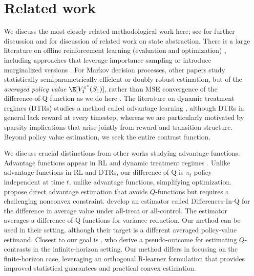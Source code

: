 \documentclass[opre,nonblindrev]{informs4}
\begin{document}
\section{Related work}
We discuss the most closely related methodological work here; see  for further discussion and  for discussion of related work on state abstraction. There is a large literature on offline reinforcement learning (evaluation and optimization) \citep{jin2021pessimism,xie2021bellman}, including approaches that leverage importance sampling or introduce marginalized versions \citep{jl16,thomas2015high,kallus2019double,liu2018breaking}. For Markov decision processes, {other papers study statistically semiparametrically efficient or doubly-robust estimation, but of the \textit{averaged policy value} $\E[V_1^{\pi^e}(S_1)]$, rather than MSE convergence of the difference-of-Q function as we do here \citep{kallus2019double,kallus2019efficiently,xie2023semiparametrically}}. The literature on dynamic treatment regimes (DTRs) studies a method called advantage learning \citep{schulte2014q}, although DTRs in general lack reward at every timestep, whereas we are particularly motivated by sparsity implications that arise jointly from reward and transition structure. Beyond policy value estimation, we seek the entire contrast function. %

We discuss crucial distinctions from other works studying advantage functions. Advantage functions appear in RL and dynamic treatment regimes \citep{neumann2008fitted,murphy2003optimal}. Unlike advantage functions in RL and DTRs, our difference-of-Q is $\pi_t$ policy-independent at time $t$, unlike advantage functions, simplifying optimization. 
\citet{pan2023learning,pan2024skill} propose direct advantage estimation that avoids $Q$-functions but requires a challenging nonconvex constraint. \citet{farias2022markovian} develop an estimator called Differences-In-Q for the difference in average value under all-treat or all-control. The estimator averages a difference of Q functions for variance reduction. Our method can be used in their setting, although their target is a different averaged policy-value estimand. Closest to our goal is \citet{shi2022statistically}, who derive a pseudo-outcome for estimating $Q$-contrasts in the infinite-horizon setting. Our method differs in focusing on the finite-horizon case, leveraging an orthogonal R-learner formulation that provides improved statistical guarantees and practical convex estimation.
\end{document}
